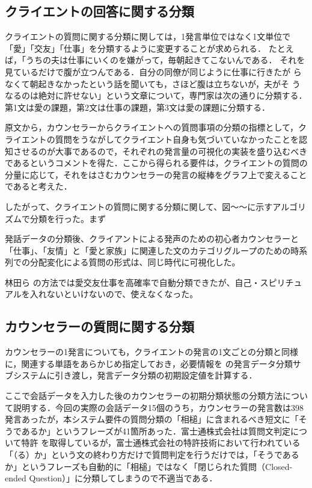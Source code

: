 \documentclass[shuuron]{kuee}
\begin{document}
\subsection{クライエントの回答に関する分類} %



クライエントの質問に関する分類に関しては，1発言単位ではなく1文単位で「愛」「交友」「仕事」を分類するように変更することが求められる．
たとえば，「うちの夫は仕事にいくのを嫌がって，毎朝起きてこないんである．
それを見ているだけで腹が立つんである．自分の同僚が同じように仕事に行きたが
らなくて朝起きなかったという話を聞いても，さほど腹は立ちないが，夫がそ
うなるのは絶対に許せない」という文章について，専門家は次の通りに分類する．第1文は愛の課題，第2文は仕事の課題，第3文は愛の課題に分類する．

原文から，カウンセラーからクライエントへの質問事項の分類の指標として，クライエントの質問をうながしてクライエント自身も気づいていなかったことを認知させるのが大事であるので，それぞれの発言量の可視化の実装を盛り込むべきであるというコメントを得た．ここから得られる要件は，クライエントの質問の分量に応じて，それをはさむカウンセラーの発言の縦棒をグラフ上で変えることであると考えた．

したがって、クライエントの質問に関する分類に関して、図〜〜に示すアルゴリズムで分類を行った。まず



発話データの分類後、クライアントによる発声のための初心者カウンセラーと「仕事」、「友情」と「愛と家族」に関連した文のカテゴリグループのための時系列での分配変化による質問の形式は、同じ時代に可視化した。

  林田ら\cite{hayashidaJp} \cite{hayashidaEn}の方法では愛交友仕事を高確率で自動分類できたが、自己・スピリチュアルを入れないといけないので、使えなくなった。

\subsection{カウンセラーの質問に関する分類} %

カウンセラーの1発言についても，クライエントの発言の1文ごとの分類と同様に，関連する単語をあらかじめ指定しておき，必要情報を
の発言データ分類サブシステムに引き渡し，発言データ分類の初期設定値を計算する．

ここで会話データを入力した後のカウンセラーの初期分類状態の分類方法について説明する．今回の実際の会話データ15個のうち，カウンセラーの発言数は398発言あったが，本システム要件の質問分類の「相槌」に含まれるべき短文に「そうであるか」というフレーズが41箇所あった．富士通株式会社は質問文判定について特許
\cite{tokkyo}
を取得しているが，富士通株式会社の特許技術において行われている「（る）か」という文の終わり方だけで質問判定を行うだけでは，「そうであるか」というフレーズも自動的に「相槌」ではなく「閉じられた質問（Closed-ended Question）」に分類してしまうので不適当である．
\end{document}
